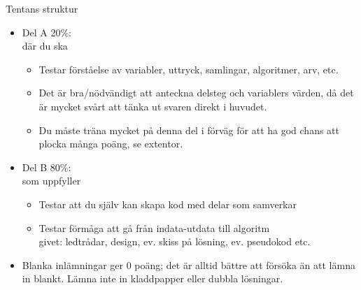 \begin{Slide}{Tentans struktur}
\begin{itemize}\SlideFontSmall
\item Del A 20\%:\\ där du ska 
\begin{itemize}\SlideFontTiny
\item Testar förståelse av variabler, uttryck, samlingar, algoritmer, arv, etc.
\item Det är bra/nödvändigt att anteckna delsteg och variablers värden, då det är mycket svårt att tänka ut svaren direkt i huvudet.
\item Du måste träna mycket på denna del i förväg för att ha god chans att plocka många poäng, se extentor.
\end{itemize}


\item Del B 80\%:\\ som uppfyller 
\begin{itemize}\SlideFontTiny
\item Testar att du själv kan skapa kod med delar som samverkar
\item Testar förmåga att gå från indata-utdata till algoritm \\
 givet: ledtrådar, design, ev. skiss på lösning, ev. pseudokod etc.
\end{itemize}
\item Blanka inlämningar ger 0 poäng; det är alltid bättre att försöka än att lämna in blankt. Lämna inte in kladdpapper eller dubbla lösningar.
\end{itemize}
\end{Slide}

%
%

